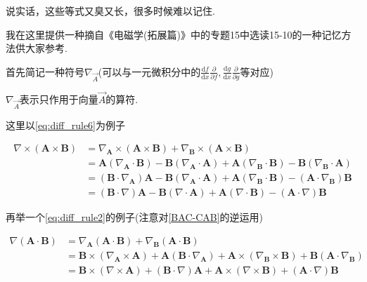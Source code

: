说实话，这些等式又臭又长，很多时候难以记住.

我在这里提供一种摘自《电磁学(拓展篇)》中的专题15中选读15-10的一种记忆方法供大家参考.

首先简记一种符号$\nabla_\vec{A}$(可以与一元微积分中的$\frac{\mathrm{d}f}{\mathrm{d}x}\frac{\partial}{\partial f},\frac{\mathrm{d}g}{\mathrm{d}x}\frac{\partial}{\partial g}$等对应)

\begin{definition}
    $\nabla_\vec{A}$表示只作用于向量$\vec{A}$的算符.
\end{definition}

这里以\cref{eq:diff_rule6}为例子

\begin{example}
    \begin{align*}
        \nabla \times \left( \mathbf{A}\times \mathbf{B} \right) &=\nabla _{\mathbf{A}}\times \left( \mathbf{A}\times \mathbf{B} \right) +\nabla _{\mathbf{B}}\times \left( \mathbf{A}\times \mathbf{B} \right) 
        \\
        &=\mathbf{A}\left( \nabla _{\mathbf{A}}\cdot \mathbf{B} \right) -\mathbf{B}\left( \nabla _{\mathbf{A}}\cdot \mathbf{A} \right) +\mathbf{A}\left( \nabla _{\mathbf{B}}\cdot \mathbf{B} \right) -\mathbf{B}\left( \nabla _{\mathbf{B}}\cdot \mathbf{A} \right)
        \\
        &=\left( \mathbf{B}\cdot \nabla _{\mathbf{A}} \right) \mathbf{A}-\mathbf{B}\left( \nabla _{\mathbf{A}}\cdot \mathbf{A} \right) +\mathbf{A}\left( \nabla _{\mathbf{B}}\cdot \mathbf{B} \right) -\left( \mathbf{A}\cdot \nabla _{\mathbf{B}} \right) \mathbf{B}
        \\
        &=\left( \mathbf{B}\cdot \nabla \right) \mathbf{A}-\mathbf{B}\left( \nabla \cdot \mathbf{A} \right) +\mathbf{A}\left( \nabla \cdot \mathbf{B} \right) -\left( \mathbf{A}\cdot \nabla \right) \mathbf{B}
    \end{align*}
\end{example}

再举一个\cref{eq:diff_rule2}的例子(注意对\cref{BAC-CAB}的逆运用)

\begin{example}
    \begin{align*}
        \nabla \left( \mathbf{A}\cdot \mathbf{B} \right) &=\nabla _{\mathbf{A}}\left( \mathbf{A}\cdot \mathbf{B} \right) +\nabla _{\mathbf{B}}\left( \mathbf{A}\cdot \mathbf{B} \right)
        \\
        &=\mathbf{B}\times \left( \nabla _{\mathbf{A}}\times \mathbf{A} \right) +\mathbf{A}\left( \mathbf{B}\cdot \nabla _{\mathbf{A}} \right) +\mathbf{A}\times \left( \nabla _{\mathbf{B}}\times \mathbf{B} \right) +\mathbf{B}\left( \mathbf{A}\cdot \nabla _{\mathbf{B}} \right) 
        \\
        &=\mathbf{B}\times \left( \nabla \times \mathbf{A} \right) +\left( \mathbf{B}\cdot \nabla \right) \mathbf{A}+\mathbf{A}\times \left( \nabla \times \mathbf{B} \right) +\left( \mathbf{A}\cdot \nabla \right) \mathbf{B}
    \end{align*}
\end{example}

